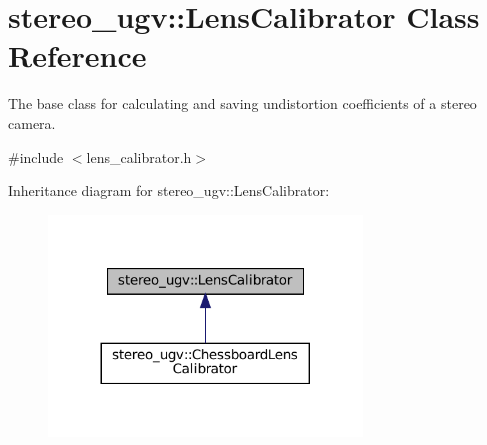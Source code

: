 \hypertarget{classstereo__ugv_1_1LensCalibrator}{}\section{stereo\+\_\+ugv\+:\+:Lens\+Calibrator Class Reference}
\label{classstereo__ugv_1_1LensCalibrator}


The base class for calculating and saving undistortion coefficients of a stereo camera.  




{\ttfamily \#include $<$lens\+\_\+calibrator.\+h$>$}



Inheritance diagram for stereo\+\_\+ugv\+:\+:Lens\+Calibrator\+:\nopagebreak
\begin{figure}[H]
\begin{center}
\leavevmode
\includegraphics[width=236pt]{classstereo__ugv_1_1LensCalibrator__inherit__graph}
\end{center}
\end{figure}
